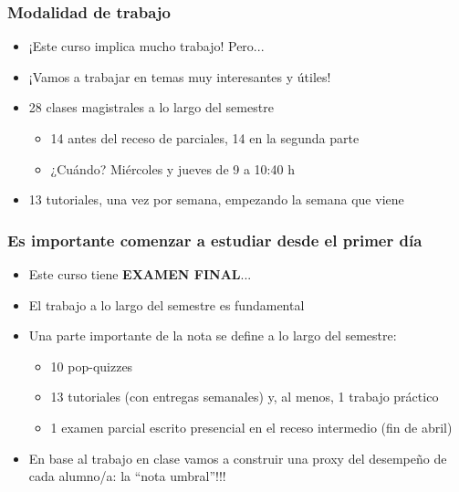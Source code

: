 \documentclass{beamer}
\begin{document}
\begin{frame}
\frametitle{Modalidad de trabajo}
\begin{itemize}
    \item ¡Este curso implica mucho trabajo! Pero...  \vspace{2mm}
    \item ¡Vamos a trabajar en temas muy interesantes y útiles!  \vspace{2mm}
    \item 28 clases magistrales a lo largo del semestre 
\begin{itemize}
        \item 14 antes del receso de parciales, 14 en la segunda parte
        \item ¿Cuándo? Miércoles y jueves de 9 a 10:40 h
\end{itemize}
    \item 13 tutoriales, una vez por semana, empezando la semana que viene 
\end{itemize}
\end{frame}

\begin{frame}
\frametitle{Es importante comenzar a estudiar desde el primer día}
\begin{itemize}
    \item Este curso tiene \textbf{EXAMEN FINAL}...
    \item El trabajo a lo largo del semestre es fundamental
    \item Una parte importante de la nota se define a lo largo del semestre:
        \begin{itemize}
            \item 10 pop-quizzes
            \item 13 tutoriales (con entregas semanales) y, al menos, 1 trabajo práctico
            \item 1 examen parcial escrito presencial en el receso intermedio (fin de abril)
        \end{itemize}
    \item En base al trabajo en clase vamos a construir una proxy del desempeño de cada alumno/a: la ``nota umbral''!!!
\end{itemize}

\end{frame}
\end{document}
